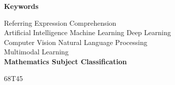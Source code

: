 \begin{center}


  \bigskip\smallskip
  \textbf{Keywords}

  Referring Expression Comprehension\\
  Artificial Intelligence \textbullet{} Machine Learning \textbullet{} Deep
  Learning\\
  Computer Vision \textbullet{} Natural Language Processing\\
  Multimodal Learning\\

  \bigskip
  \textbf{Mathematics Subject Classification}

  68T45
\end{center}

\vfill\null


\clearpage
\thispagestyle{plain}
\null\vfill

